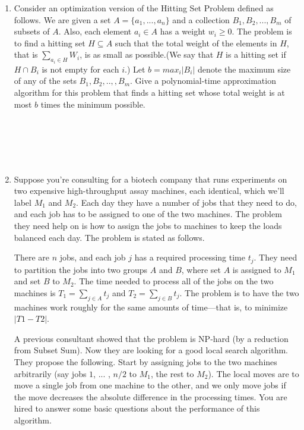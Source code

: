 \documentclass{article}
\begin{document}
\begin{enumerate}
\item Consider an optimization version of the Hitting Set Problem defined as follows. We are given a set $A=\{a_1,...,a_n\}$ and a collection $B_1, B_2, . . . , B_m$ of subsets of $A$. Also, each element $a_i \in A$ has a weight $w_i \geqslant  0$. The problem is to find a hitting set $H \subseteq A$ such that the total weight of the elements in $H$, that is $\sum_{a_i\in H}W_i$, is as small as possible.(We 
say that $H$ is a hitting set if $H \cap B_i$ is not empty for each $i$.) Let $b = max_i |B_i|$ denote the maximum size of any of the sets $B_1, B_2, ..,, B_m$. Give a polynomial-time approximation algorithm for this problem that finds a hitting set whose total weight is at most $b$ times the minimum possible.


~\\
~\\
~\\
~\\

\item Suppose you’re consulting for a biotech company that runs experiments on two expensive high-throughput assay machines, each identical, which we’ll label $M_1$ and $M_2$. Each day they have a number of jobs that they need to do, and each job has to be assigned to one of the two machines. The problem they need help on is how to assign the jobs to machines to keep the loads balanced each day. The problem is stated as follows. 

There are $n$ jobs, and each job $j$ has a required processing time $t_j$. They need to partition the jobs into two groups $A$ and $B$, where set $A$ is assigned to $M_1$ and set $B$ to $M_2$. The time needed to process all of the jobs on the two machines is $T_1 = \sum_{j \in A} t_j$ and $T_2 = \sum_{j \in B} t_j$. The problem is to have the two machines work roughly for the same amounts of time—that is, to minimize $\left | T1 - T2 \right |$.

A previous consultant showed that the problem is NP-hard (by a reduction from Subset Sum). Now they are looking for a good local search algorithm. They propose the following. Start by assigning jobs to the two machines arbitrarily (say jobs $1$, ... , $n/2$ to $M_1$, the rest to $M_2$). The local moves are to move a single job from one machine to the other, and we only move jobs if the move decreases the absolute difference in the processing times. You are hired to answer some basic questions about the performance of this algorithm.


\end{enumerate}
\end{document}
